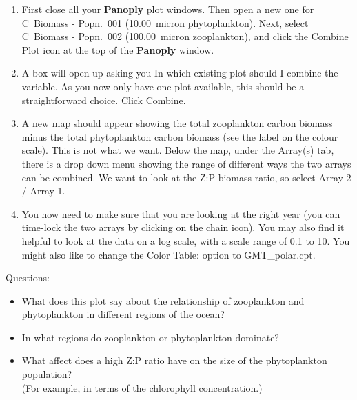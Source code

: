 \documentclass[11pt,fleqn]{book} %
\begin{document}
\vspace{2mm}
\begin{enumerate}[noitemsep]

\item First close all your \textbf{Panoply} plot windows. Then open a new one for \textsf{\small C~Biomass - Popn.~001 (10.00~micron phytoplankton)}. Next, select \textsf{\small C~Biomass - Popn.~002 (100.00~micron zooplankton)}, and click the \textsf{\small Combine Plot} icon at the top of the \textbf{Panoply} window.

\item A box will open up asking you \textsf{\small In which existing plot should I combine the variable}. As you now only have one plot available, this should be a straightforward choice. Click \textsf{\small Combine}.

\item A new map should appear showing the total zooplankton carbon biomass minus the total phytoplankton carbon biomass (see the label on the colour scale). This is not what we want. Below the map, under the \textsf{\small Array(s)} tab, there is a drop down menu showing the range of different ways the two arrays can be combined. We want to look at the Z:P biomass ratio, so select \textsf{\small Array 2 / Array 1}.

\item You now need to make sure that you are looking at the right year (you can time-lock the two arrays by clicking on the chain icon). You may also find it helpful to look at the data on a log scale, with a scale range of \textsf{\small 0.1} to \textsf{\small 10}. You might also like to change the \textsf{\small Color Table:} option to \textsf{\small GMT\_polar.cpt}. 

\end{enumerate}
\vspace{2mm}

Questions:

\begin{itemize}
\item What does this plot say about the relationship of zooplankton and phytoplankton in different regions of the ocean?
\item In what regions do zooplankton or phytoplankton dominate?
\item What affect does a high Z:P ratio have on the size of the phytoplankton population?\\(For example, in terms of the chlorophyll concentration.)
\end{itemize}
\end{document}
